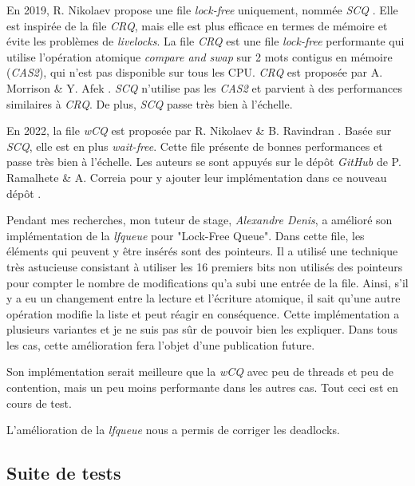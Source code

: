 En 2019, R. Nikolaev propose une file \emph{lock-free} uniquement, nommée \emph{SCQ} \cite{10.4230/lipics.disc.2019.28}.
Elle est inspirée de la file \emph{CRQ}, mais elle est plus efficace en termes de mémoire et évite les problèmes de \emph{livelocks}.
La file \emph{CRQ} est une file \emph{lock-free} performante qui utilise l'opération atomique \emph{compare and swap} sur 2 mots contigus en mémoire (\emph{CAS2}),
qui n'est pas disponible sur tous les CPU.
\emph{CRQ} est proposée par A. Morrison \& Y. Afek \cite{10.1145/2517327.2442527}.
\emph{SCQ} n'utilise pas les \emph{CAS2} et parvient à des performances similaires à \emph{CRQ}.
De plus, \emph{SCQ} passe très bien à l'échelle.

En 2022, la file \emph{wCQ} est proposée par R. Nikolaev \& B. Ravindran \cite{10.1145/3490148.3538572}.
Basée sur \emph{SCQ}, elle est en plus \emph{wait-free}.
Cette file présente de bonnes performances et passe très bien à l'échelle.
Les auteurs se sont appuyés sur le dépôt \emph{GitHub} de P. Ramalhete \& A. Correia pour y ajouter leur implémentation dans ce nouveau dépôt \cite{wCQ}.

Pendant mes recherches, mon tuteur de stage, \emph{Alexandre Denis},
a amélioré son implémentation de la \emph{lfqueue} pour "Lock-Free Queue".
Dans cette file, les éléments qui peuvent y être insérés sont des pointeurs.
Il a utilisé une technique très astucieuse consistant à utiliser les 16 premiers bits non utilisés des pointeurs
pour compter le nombre de modifications qu'a subi une entrée de la file.
Ainsi, s'il y a eu un changement entre la lecture et l'écriture atomique,
il sait qu'une autre opération modifie la liste et peut réagir en conséquence.
Cette implémentation a plusieurs variantes et je ne suis pas sûr de pouvoir bien les expliquer.
Dans tous les cas, cette amélioration fera l'objet d'une publication future.

Son implémentation serait meilleure que la \emph{wCQ} avec peu de threads et peu de contention,
mais un peu moins performante dans les autres cas. Tout ceci est en cours de test.

L'amélioration de la \emph{lfqueue} nous a permis de corriger les deadlocks.


\subsection{Suite de tests}

